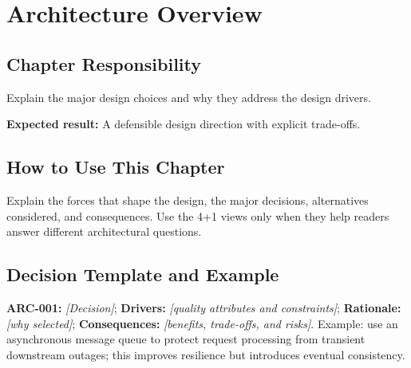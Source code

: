 \chapter{Architecture Overview}
\section{Chapter Responsibility}
\label{Section:ArchitectureOverviewResponsibility}
Explain the major design choices and why they address the design drivers.

\noindent\textbf{Expected result:} A defensible design direction with explicit trade-offs.

\section{How to Use This Chapter}
Explain the forces that shape the design, the major decisions, alternatives considered, and consequences. Use the 4+1 views only when they help readers answer different architectural questions.
\section{Decision Template and Example}
\textbf{ARC-001:} \textit{[Decision]}; \textbf{Drivers:} \textit{[quality attributes and constraints]}; \textbf{Rationale:} \textit{[why selected]}; \textbf{Consequences:} \textit{[benefits, trade-offs, and risks]}. Example: use an asynchronous message queue to protect request processing from transient downstream outages; this improves resilience but introduces eventual consistency.
